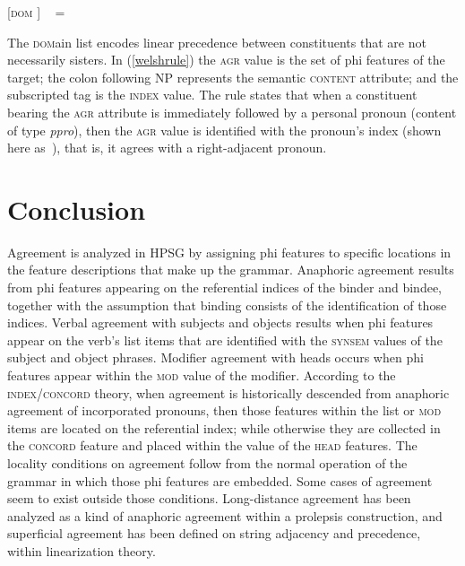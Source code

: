 \documentclass[output=paper,biblatex,babelshorthands,newtxmath,draftmode,colorlinks,citecolor=brown]{langscibook}
\begin{document}
\begin{exe}
\ex \label{welshrule}
{}[\textsc{dom}   ]  %
\impl  \  = 
\end{exe}

\noindent
The \textsc{dom}ain list encodes linear precedence between constituents that are not necessarily sisters.  In (\ref{welshrule}) the \textsc{agr} value is the set of phi features of the target; the colon following NP represents the semantic \textsc{content} attribute; and the subscripted tag  is the \textsc{index} value.  The rule states that when a constituent bearing the \textsc{agr} attribute is immediately followed by a personal pronoun (content of type \textit{ppro}), then the \textsc{agr} value is identified with the pronoun's index (shown here as \,), that is, it agrees with a right-adjacent pronoun.  



\section{Conclusion} 

Agreement is analyzed in HPSG by assigning phi features to specific locations in the feature
descriptions that make up the grammar. Anaphoric agreement results from phi
features appearing on the referential indices of the binder and bindee, together with the assumption
that binding consists of the identification of those indices.  Verbal agreement with subjects and
objects results when phi features appear on the verb's \argst list items that are identified with
the \textsc{synsem} values of the subject and object phrases.  Modifier agreement with heads occurs
when phi features appear within the \textsc{mod} value of the modifier.  According to the
\textsc{index}/\textsc{concord} theory, when agreement is historically descended from anaphoric
agreement of incorporated pronouns, then those features within the \argst list or \textsc{mod} items
are located  on the referential index; while otherwise they are collected in the \textsc{concord}
feature and placed within the value of the \textsc{head} features.   The locality conditions on
agreement follow from the normal operation of the grammar in which those phi features are embedded.
Some cases of agreement seem to exist outside those conditions.  Long-distance agreement has been
analyzed as a kind of anaphoric agreement within a prolepsis construction, and superficial agreement
has been defined on string adjacency and precedence, within linearization theory.  
\end{document}
